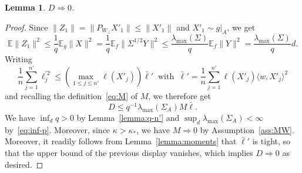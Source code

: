 \documentclass[]{article}
\newcommand{\E}{\mathbb{E}}
\theoremstyle{plain}
\newtheorem{lemma}{Lemma}[section]
\theoremstyle{definition}
\begin{document}
\begin{lemma}
	$D \Rightarrow 0$.
\end{lemma}

\begin{proof}
	Since $\lVert Z_1 \rVert = \lVert P_{W_\perp} X'_1 \rVert \leq \lVert X'_1 \rVert$ and $X'_1 \sim g|_A$, we get
	\[ \E\lVert Z_1 \rVert^2 \leq \frac{1}{q} \E_g \lVert X \rVert^2 = \frac{1}{q} \E_f \lVert \Sigma^{1/2} Y \rVert^2 \leq \frac{\lambda_{\max}(\Sigma)}{q} \E_f \lVert Y \rVert^2 = \frac{\lambda_{\max}(\Sigma)}{q} d.  \]
	Writing
	\[ \frac{1}{n} \sum_{j = 1}^{n'} \ell_j^{\prime 2} \leq \left( \max_{1 \leq j \leq n'} \ell(X'_j) \right) \bar \ell' \ \text{ with } \ \bar \ell' = \frac{1}{n} \sum_{j = 1}^{n'} \ell(X'_j) \langle w, X'_j \rangle^2 \]
	and recalling the definition~\eqref{eq:M} of $M$, we therefore get
	\[ D \leq q^{-1} \lambda_{\max}(\Sigma_A) M \bar \ell. \]
	We have $\inf_d q > 0$ by Lemma~\ref{lemma:q-n'} and $\sup_d \lambda_{\max}(\Sigma_A) < \infty$ by~\eqref{eq:inf-p}. Moreover, since $\kappa > \kappa_*$, we have $M \Rightarrow 0$ by Assumption~\ref{ass:MW}. Moreover, it readily follows from Lemma~\ref{lemma:moments} that $\bar \ell'$ is tight, so that the upper bound of the previous display vanishes, which implies $D \Rightarrow 0$ as desired.
\end{proof}
\end{document}
